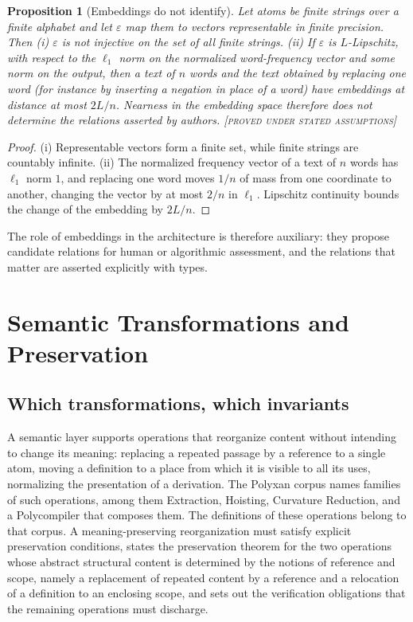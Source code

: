 \documentclass[11pt,twoside,openright]{book}
\theoremstyle{plain}
\newtheorem{proposition}[theorem]{Proposition}
\theoremstyle{definition}
\theoremstyle{remark}
\newcommand{\Proved}{\textup{\textsc{[proved under stated assumptions]}}}
\begin{document}
\begin{proposition}[Embeddings do not identify]\label{prop:embed}
Let atoms be finite strings over a finite alphabet and let $\varepsilon$ map them to vectors representable in finite precision. Then (i) $\varepsilon$ is not injective on the set of all finite strings. (ii) If $\varepsilon$ is $L$-Lipschitz, with respect to the $\ell_1$ norm on the normalized word-frequency vector and some norm on the output, then a text of $n$ words and the text obtained by replacing one word (for instance by inserting a negation in place of a word) have embeddings at distance at most $2L/n$. Nearness in the embedding space therefore does not determine the relations asserted by authors.
\Proved{}
\end{proposition}

\begin{proof}
(i) Representable vectors form a finite set, while finite strings are countably infinite. (ii) The normalized frequency vector of a text of $n$ words has $\ell_1$ norm $1$, and replacing one word moves $1/n$ of mass from one coordinate to another, changing the vector by at most $2/n$ in $\ell_1$. Lipschitz continuity bounds the change of the embedding by $2L/n$.
\end{proof}

The role of embeddings in the architecture is therefore auxiliary: they propose candidate relations for human or algorithmic assessment, and the relations that matter are asserted explicitly with types.

\chapter{Semantic Transformations and Preservation}\label{ch:transformations}

\section{Which transformations, which invariants}

A semantic layer supports operations that reorganize content without intending to change its meaning: replacing a repeated passage by a reference to a single atom, moving a definition to a place from which it is visible to all its uses, normalizing the presentation of a derivation. The Polyxan corpus names families of such operations, among them Extraction, Hoisting, Curvature Reduction, and a Polycompiler that composes them. The definitions of these operations belong to that corpus. A meaning-preserving reorganization must satisfy explicit preservation conditions, states the preservation theorem for the two operations whose abstract structural content is determined by the notions of reference and scope, namely a replacement of repeated content by a reference and a relocation of a definition to an enclosing scope, and sets out the verification obligations that the remaining operations must discharge.
\end{document}
